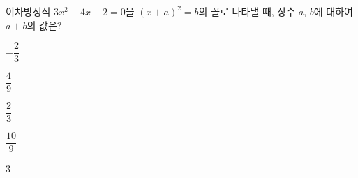 이차방정식 $3x^2-4x-2=0$을 $(x+a)^2=b$의 꼴로 나타낼 때, 상수 $a$, $b$에 대하여 $a+b$의 값은?
\begin{choices32}{\rule[-3ex]{0pt}{8ex}$-\dfrac{2}{3}$}{\rule[-3ex]{0pt}{8ex}$\dfrac{4}{9}$}{\rule[-3ex]{0pt}{8ex}$\dfrac{2}{3}$}{\rule[-3ex]{0pt}{8ex}$\dfrac{10}{9}$}{\rule[-3ex]{0pt}{8ex}$3$}\end{choices32}
